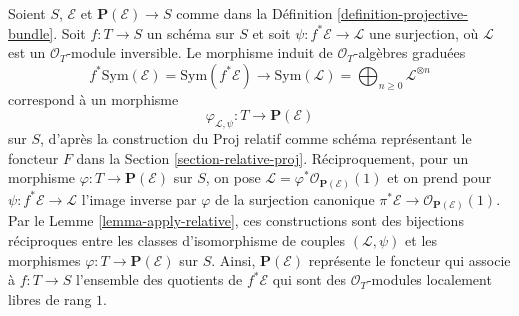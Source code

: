 \medskip\noindent
Soient $S$, $\mathcal{E}$ et $\mathbf{P}(\mathcal{E}) \to S$ comme dans la
Définition \ref{definition-projective-bundle}. Soit $f : T \to S$ un
schéma sur $S$ et soit $\psi : f^*\mathcal{E} \to \mathcal{L}$ une
surjection, où $\mathcal{L}$ est un $\mathcal{O}_T$-module inversible.
Le morphisme induit de $\mathcal{O}_T$-algèbres graduées
$$
f^*\text{Sym}(\mathcal{E}) = \text{Sym}(f^*\mathcal{E}) \to
\text{Sym}(\mathcal{L}) = \bigoplus\nolimits_{n \geq 0} \mathcal{L}^{\otimes n}
$$
correspond à un morphisme
$$
\varphi_{\mathcal{L}, \psi} : T \longrightarrow \mathbf{P}(\mathcal{E})
$$
sur $S$, d'après la construction du Proj relatif comme schéma représentant
le foncteur $F$ dans la Section \ref{section-relative-proj}.
Réciproquement, pour un morphisme $\varphi : T \to \mathbf{P}(\mathcal{E})$
sur $S$, on pose
$\mathcal{L} = \varphi^*\mathcal{O}_{\mathbf{P}(\mathcal{E})}(1)$ et on
prend pour $\psi : f^*\mathcal{E} \to \mathcal{L}$ l'image inverse par
$\varphi$ de la surjection canonique
$\pi^*\mathcal{E} \to \mathcal{O}_{\mathbf{P}(\mathcal{E})}(1)$.
Par le Lemme \ref{lemma-apply-relative}, ces constructions sont des
bijections réciproques entre les classes d'isomorphisme de couples
$(\mathcal{L}, \psi)$ et les morphismes
$\varphi : T \to \mathbf{P}(\mathcal{E})$ sur $S$.
Ainsi, $\mathbf{P}(\mathcal{E})$ représente le foncteur qui associe à
$f : T \to S$ l'ensemble des quotients de $f^*\mathcal{E}$ qui sont des
$\mathcal{O}_T$-modules localement libres de rang $1$.

